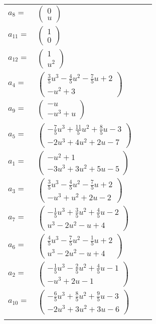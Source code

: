 \documentclass[1p]{elsarticle_modified}
\theoremstyle{definition}
\begin{document}
\begin{tabular}{m{7pt} m{180pt} m{7pt} m{180pt} }
\flushright $a_{8}=$&$\begin{pmatrix}0\\u\end{pmatrix}$ \\
\flushright $a_{11}=$&$\begin{pmatrix}1\\0\end{pmatrix}$ \\
\flushright $a_{12}=$&$\begin{pmatrix}1\\u^2\end{pmatrix}$ \\
\flushright $a_{4}=$&$\begin{pmatrix}\frac{3}{5} u^3-\frac{4}{5} u^2-\frac{7}{5} u+2\\- u^2+3\end{pmatrix}$ \\
\flushright $a_{9}=$&$\begin{pmatrix}- u\\- u^3+u\end{pmatrix}$ \\
\flushright $a_{5}=$&$\begin{pmatrix}-\frac{7}{5} u^3+\frac{11}{5} u^2+\frac{8}{5} u-3\\-2 u^3+4 u^2+2 u-7\end{pmatrix}$ \\
\flushright $a_{1}=$&$\begin{pmatrix}- u^2+1\\-3 u^3+3 u^2+5 u-5\end{pmatrix}$ \\
\flushright $a_{3}=$&$\begin{pmatrix}\frac{3}{5} u^3-\frac{4}{5} u^2-\frac{7}{5} u+2\\- u^3+u^2+2 u-2\end{pmatrix}$ \\
\flushright $a_{7}=$&$\begin{pmatrix}-\frac{1}{5} u^3+\frac{3}{5} u^2+\frac{4}{5} u-2\\u^3-2 u^2- u+4\end{pmatrix}$ \\
\flushright $a_{6}=$&$\begin{pmatrix}\frac{4}{5} u^3-\frac{7}{5} u^2-\frac{1}{5} u+2\\u^3-2 u^2- u+4\end{pmatrix}$ \\
\flushright $a_{2}=$&$\begin{pmatrix}-\frac{1}{5} u^3-\frac{2}{5} u^2+\frac{4}{5} u-1\\- u^3+2 u-1\end{pmatrix}$ \\
\flushright $a_{10}=$&$\begin{pmatrix}-\frac{6}{5} u^3+\frac{8}{5} u^2+\frac{9}{5} u-3\\-2 u^3+3 u^2+3 u-6\end{pmatrix}$\\&\end{tabular}
\end{document}
